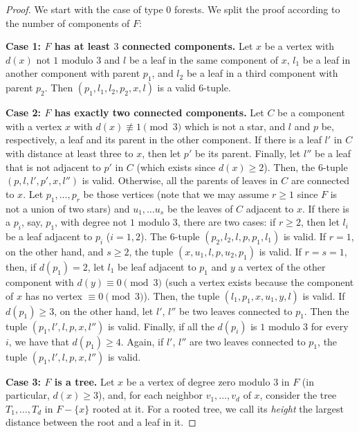 \documentclass[11pt]{article}
\begin{document}
\begin{proof}
    We start with the case of type $0$ forests. We split the proof according to the number of components of $F$:

    \textbf{Case 1: $F$ has at least $3$ connected components.} Let $x$ be a vertex with $d(x)$ not $1$ modulo $3$ and $l$ be a leaf in the same component of $x$, $l_1$ be a leaf in another component with parent $p_1$, and $l_2$ be a leaf in a third component with parent $p_2$. Then $(p_1,l_1,l_2,p_2,x,l)$ is a valid $6$-tuple.

    \textbf{Case 2: $F$ has exactly two connected components.} Let $C$ be a component with a vertex $x$ with $d(x) \not\equiv 1 \pmod 3$ which is not a star, and $l$ and $p$ be, respectively, a leaf and its parent in the other component. If there is a leaf $l'$ in $C$ with distance at least three to $x$, then let $p'$ be its parent. Finally, let $l''$ be a leaf that is not adjacent to $p'$ in $C$ (which exists since $d(x) \geq 2$). Then, the $6$-tuple $(p,l,l',p',x,l'')$ is valid. Otherwise, all the parents of leaves in $C$ are connected to $x$. Let $p_1, \dots, p_r$ be those vertices (note that we may assume $r \geq 1$ since $F$ is not a union of two stars) and $u_1, \dots u_s$ be the leaves of $C$ adjacent to $x$. If there is a $p_i$, say, $p_1$, with degree not $1$ modulo $3$, there are two cases: if $r \geq 2$, then let $l_i$ be a leaf adjacent to $p_i$ ($i=1,2$). The $6$-tuple $(p_2,l_2,l,p,p_1,l_1)$ is valid. If $r=1$, on the other hand, and $s \geq 2$, the tuple $(x,u_1,l,p,u_2,p_1)$ is valid. If $r=s=1$, then, if $d(p_1)=2$, let $l_1$ be leaf adjacent to $p_1$ and $y$ a vertex of the other component with $d(y) \equiv 0 \pmod 3$ (such a vertex exists because the component of $x$ has no vertex $\equiv 0 \pmod 3$). Then, the tuple $(l_1,p_1,x,u_1,y,l)$ is valid. If $d(p_1) \geq 3$, on the other hand, let $l'$, $l''$ be two leaves connected to $p_1$. Then the tuple $(p_1,l',l,p,x,l'')$ is valid. Finally, if all the $d(p_i)$ is $1$ modulo $3$ for every $i$, we have that $d(p_1) \geq 4$. Again, if $l'$, $l''$ are two leaves connected to $p_1$, the tuple $(p_1,l',l,p,x,l'')$ is valid.  

   
    \textbf{Case 3: $F$ is a tree.} Let $x$ be a vertex of degree zero modulo $3$ in $F$ (in particular, $d(x) \geq 3$), and, for each neighbor $v_1,\dots,v_d$ of $x$, consider the tree $T_1,\dots,T_d$ in $F-\{x\}$ rooted at it. For a rooted tree, we call its \emph{height} the largest distance between the root and a leaf in it.


\end{proof}
\end{document}
